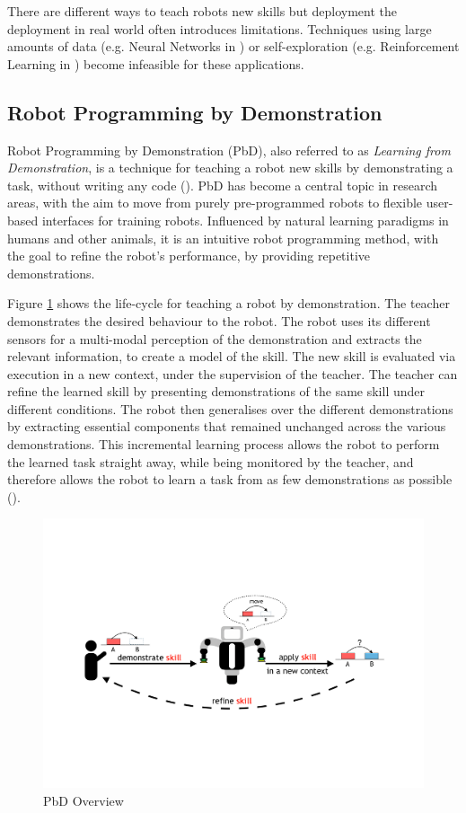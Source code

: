 There are different ways to teach robots new skills but deployment the deployment in real world often introduces limitations. 
Techniques using large amounts of data (e.g. Neural Networks in \cite{billard2001robust}) or self-exploration (e.g. Reinforcement Learning in \cite{smart2002effective}) become infeasible for these applications.

\subsection{Robot Programming by Demonstration}
Robot Programming by Demonstration (PbD), also referred to as \textit{Learning from Demonstration}, is a technique for teaching a robot new skills by demonstrating a task, without writing any code (\cite{billard2008robot}).
PbD has become a central topic in research areas, with the aim to move from purely pre-programmed robots to flexible user-based interfaces for training robots.
Influenced by natural learning paradigms in humans and other animals, it is an intuitive robot programming method, with the goal to refine the robot's performance, by providing repetitive demonstrations.

Figure \ref{fig:Principle Overview} shows the life-cycle for teaching a robot by demonstration.
The teacher demonstrates the desired behaviour to the robot.
The robot uses its different sensors for a multi-modal perception of the demonstration and extracts the relevant information, to create a model of the skill.
The new skill is evaluated via execution in a new context, under the supervision of the teacher.
The teacher can refine the learned skill by presenting demonstrations of the same skill under different conditions.
The robot then generalises over the different demonstrations by extracting essential components that remained unchanged across the various demonstrations.
This incremental learning process allows the robot to perform the learned task straight away, while being monitored by the teacher, and therefore allows the robot to learn a task from as few demonstrations as possible (\cite{billard2008robot}).

  \begin{figure}[h]
    \centering
    \includegraphics[scale=0.7]{figures/PbD-Overview}
    \caption{PbD Overview}
    \label{fig:Principle Overview}
  \end{figure}

